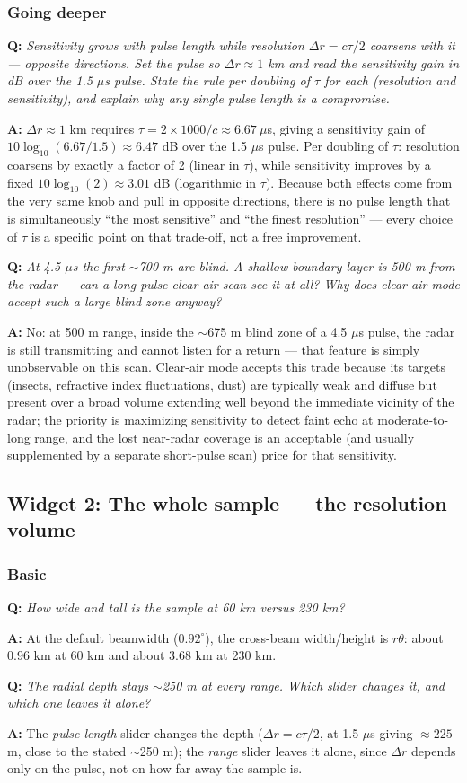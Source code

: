 \documentclass[11pt]{article}
\newenvironment{qa}[1]{\par\noindent\textbf{\color{qgray}Q: }\emph{#1}\par\noindent\textbf{A: }}{\par\vspace{6pt}}
\newcommand{\tier}[1]{\subsubsection*{#1}}
\begin{document}
\tier{Going deeper}
\begin{qa}{Sensitivity grows with pulse length while resolution $\Delta r=c\tau/2$ coarsens with it --- opposite directions. Set the pulse so $\Delta r\approx1$ km and read the sensitivity gain in dB over the 1.5 $\mu$s pulse. State the rule per doubling of $\tau$ for each (resolution and sensitivity), and explain why any single pulse length is a compromise.}
$\Delta r\approx1$ km requires $\tau = 2\times1000/c \approx6.67\ \mu$s, giving a sensitivity gain of $10\log_{10}(6.67/1.5)\approx6.47$ dB over the 1.5 $\mu$s pulse. Per doubling of $\tau$: resolution coarsens by exactly a factor of 2 (linear in $\tau$), while sensitivity improves by a fixed $10\log_{10}(2)\approx3.01$ dB (logarithmic in $\tau$). Because both effects come from the very same knob and pull in opposite directions, there is no pulse length that is simultaneously ``the most sensitive'' and ``the finest resolution'' --- every choice of $\tau$ is a specific point on that trade-off, not a free improvement.
\end{qa}
\begin{qa}{At 4.5 $\mu$s the first $\sim$700 m are blind. A shallow boundary-layer is 500 m from the radar --- can a long-pulse clear-air scan see it at all? Why does clear-air mode accept such a large blind zone anyway?}
No: at 500 m range, inside the $\sim$675 m blind zone of a 4.5 $\mu$s pulse, the radar is still transmitting and cannot listen for a return --- that feature is simply unobservable on this scan. Clear-air mode accepts this trade because its targets (insects, refractive index fluctuations, dust) are typically weak and diffuse but present over a broad volume extending well beyond the immediate vicinity of the radar; the priority is maximizing sensitivity to detect faint echo at moderate-to-long range, and the lost near-radar coverage is an acceptable (and usually supplemented by a separate short-pulse scan) price for that sensitivity.
\end{qa}

\subsection{Widget 2: The whole sample --- the resolution volume}

\tier{Basic}
\begin{qa}{How wide and tall is the sample at 60 km versus 230 km?}
At the default beamwidth ($0.92^\circ$), the cross-beam width/height is $r\theta$: about 0.96 km at 60 km and about 3.68 km at 230 km.
\end{qa}
\begin{qa}{The radial depth stays $\sim$250 m at every range. Which slider changes it, and which one leaves it alone?}
The \emph{pulse length} slider changes the depth ($\Delta r=c\tau/2$, at 1.5 $\mu$s giving $\approx225$ m, close to the stated $\sim$250 m); the \emph{range} slider leaves it alone, since $\Delta r$ depends only on the pulse, not on how far away the sample is.
\end{qa}
\end{document}
